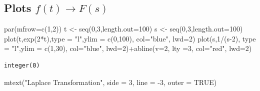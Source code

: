 \documentclass[
  letterpaper,
  DIV=11,
  numbers=noendperiod]{scrreprt}
\newenvironment{Shaded}{\begin{snugshade}}{\end{snugshade}}
\newcommand{\AttributeTok}[1]{\textcolor[rgb]{0.40,0.45,0.13}{#1}}
\newcommand{\ConstantTok}[1]{\textcolor[rgb]{0.56,0.35,0.01}{#1}}
\newcommand{\DecValTok}[1]{\textcolor[rgb]{0.68,0.00,0.00}{#1}}
\newcommand{\FunctionTok}[1]{\textcolor[rgb]{0.28,0.35,0.67}{#1}}
\newcommand{\NormalTok}[1]{\textcolor[rgb]{0.00,0.23,0.31}{#1}}
\newcommand{\OtherTok}[1]{\textcolor[rgb]{0.00,0.23,0.31}{#1}}
\newcommand{\SpecialCharTok}[1]{\textcolor[rgb]{0.37,0.37,0.37}{#1}}
\newcommand{\StringTok}[1]{\textcolor[rgb]{0.13,0.47,0.30}{#1}}
\theoremstyle{plain}
\theoremstyle{remark}
\begin{document}
\subsection{\texorpdfstring{Plots
\(f(t)\rightarrow F(s)\)}{Plots f(t)\textbackslash rightarrow F(s)}}\label{plots-ftrightarrow-fs}

\begin{Shaded}
\begin{Highlighting}[]
\FunctionTok{par}\NormalTok{(}\AttributeTok{mfrow=}\FunctionTok{c}\NormalTok{(}\DecValTok{1}\NormalTok{,}\DecValTok{2}\NormalTok{))}
\NormalTok{t }\OtherTok{\textless{}{-}} \FunctionTok{seq}\NormalTok{(}\DecValTok{0}\NormalTok{,}\DecValTok{3}\NormalTok{,}\AttributeTok{length.out=}\DecValTok{100}\NormalTok{)}
\NormalTok{s }\OtherTok{\textless{}{-}} \FunctionTok{seq}\NormalTok{(}\DecValTok{0}\NormalTok{,}\DecValTok{3}\NormalTok{,}\AttributeTok{length.out=}\DecValTok{100}\NormalTok{)}
\FunctionTok{plot}\NormalTok{(t,}\FunctionTok{exp}\NormalTok{(}\DecValTok{2}\SpecialCharTok{*}\NormalTok{t),}\AttributeTok{type =} \StringTok{"l"}\NormalTok{,}\AttributeTok{ylim =} \FunctionTok{c}\NormalTok{(}\DecValTok{0}\NormalTok{,}\DecValTok{100}\NormalTok{), }\AttributeTok{col=}\StringTok{"blue"}\NormalTok{, }\AttributeTok{lwd=}\DecValTok{2}\NormalTok{)}
\FunctionTok{plot}\NormalTok{(s,}\DecValTok{1}\SpecialCharTok{/}\NormalTok{(s}\DecValTok{{-}2}\NormalTok{), }\AttributeTok{type =} \StringTok{"l"}\NormalTok{,}\AttributeTok{ylim =} \FunctionTok{c}\NormalTok{(}\DecValTok{1}\NormalTok{,}\DecValTok{30}\NormalTok{), }\AttributeTok{col=}\StringTok{"blue"}\NormalTok{, }\AttributeTok{lwd=}\DecValTok{2}\NormalTok{)}\SpecialCharTok{+}\FunctionTok{abline}\NormalTok{(}\AttributeTok{v=}\DecValTok{2}\NormalTok{, }\AttributeTok{lty =}\DecValTok{3}\NormalTok{, }\AttributeTok{col=}\StringTok{"red"}\NormalTok{, }\AttributeTok{lwd=}\DecValTok{2}\NormalTok{)}
\end{Highlighting}
\end{Shaded}

\begin{verbatim}
integer(0)
\end{verbatim}

\begin{Shaded}
\begin{Highlighting}[]
\FunctionTok{mtext}\NormalTok{(}\StringTok{"Laplace Transformation"}\NormalTok{, }\AttributeTok{side =} \DecValTok{3}\NormalTok{, }\AttributeTok{line =} \SpecialCharTok{{-}}\DecValTok{3}\NormalTok{, }\AttributeTok{outer =} \ConstantTok{TRUE}\NormalTok{)}
\end{Highlighting}
\end{Shaded}
\end{document}
